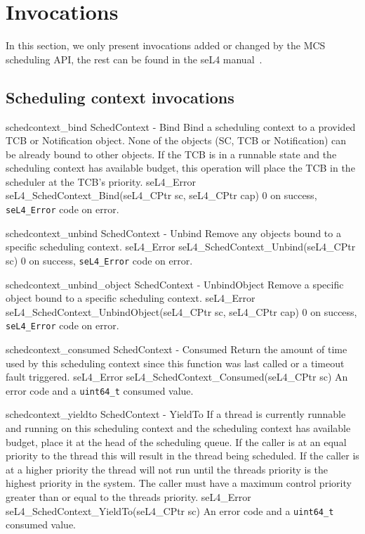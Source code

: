 \section{Invocations}

In this section, we only present invocations added or changed by the MCS scheduling API, the rest
can be found in the seL4 manual~\citep{seL417}. 

\subsection{Scheduling context invocations}
\label{api:sc}
\apidoc
{schedcontext_bind}
{SchedContext - Bind}
{ Bind a scheduling context to a provided TCB or Notification object. None of the objects (SC, TCB
or Notification) can be already bound to other objects. If the TCB is in a runnable state and the
scheduling context has available budget, this operation will place the TCB in the scheduler at the
TCB's priority.}
{seL4_Error seL4_SchedContext_Bind(seL4_CPtr sc, seL4_CPtr cap)}
{
}
{0 on success, \texttt{seL4_Error} code on error.}

\apidoc
{schedcontext_unbind}
{SchedContext - Unbind}
{ Remove any objects bound to a specific scheduling context.}
{seL4_Error seL4_SchedContext_Unbind(seL4_CPtr sc)}
{
}
{0 on success, \texttt{seL4_Error} code on error.}

\apidoc
{schedcontext_unbind_object}
{SchedContext - UnbindObject}
{ Remove a specific object bound to a specific scheduling context.}
{seL4_Error seL4_SchedContext_UnbindObject(seL4_CPtr sc, seL4_CPtr cap)}
{
}
{0 on success, \texttt{seL4_Error} code on error.}

\apidoc
{schedcontext_consumed}
{SchedContext - Consumed}
{ Return the amount of time used by this scheduling context since this function
    was last called or a timeout fault triggered.}
    {seL4_Error seL4_SchedContext_Consumed(seL4_CPtr sc)}
{
}
{An error code and a \texttt{uint64_t} consumed value.}

\apidoc
{schedcontext_yieldto}
{SchedContext - YieldTo}
{ 
   If a thread is currently runnable and running on this scheduling context and the scheduling context has available budget, place it at the head of the scheduling queue.
              If the caller is at an equal priority to the thread this will result in the thread being scheduled.
              If the caller is at a higher priority the thread will not run until the threads priority is the highest priority in the system.
              The caller must have a maximum control priority greater than or equal to the threads priority.
}
{seL4_Error seL4_SchedContext_YieldTo(seL4_CPtr sc)}
{
}
{An error code and a \texttt{uint64_t} consumed value.}

